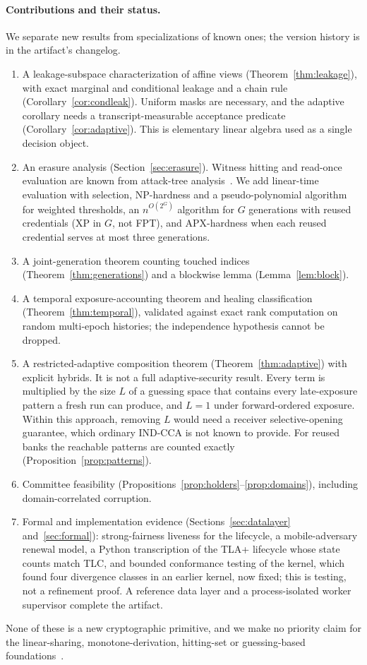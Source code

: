 \documentclass[pdflatex,sn-mathphys-num,twocolumn]{sn-jnl}
\theoremstyle{plain}
\theoremstyle{definition}
\begin{document}
\paragraph{Contributions and their status.}
We separate new results from specializations of known ones; the version history is in the artifact's changelog.
\begin{enumerate}
\item A leakage-subspace characterization of affine views (Theorem~\ref{thm:leakage}), with exact marginal and conditional leakage and a chain rule (Corollary~\ref{cor:condleak}). Uniform masks are necessary, and the adaptive corollary needs a transcript-measurable acceptance predicate (Corollary~\ref{cor:adaptive}). This is elementary linear algebra used as a single decision object.
\item An erasure analysis (Section~\ref{sec:erasure}). Witness hitting and read-once evaluation are known from attack-tree analysis~\cite{mauw2005,lopuhaa2022}. We add linear-time evaluation with selection, NP-hardness and a pseudo-polynomial algorithm for weighted thresholds, an $n^{O(2^G)}$ algorithm for $G$ generations with reused credentials (XP in $G$, not FPT), and APX-hardness when each reused credential serves at most three generations.
\item A joint-generation theorem counting touched indices (Theorem~\ref{thm:generations}) and a blockwise lemma (Lemma~\ref{lem:block}).
\item A temporal exposure-accounting theorem and healing classification (Theorem~\ref{thm:temporal}), validated against exact rank computation on random multi-epoch histories; the independence hypothesis cannot be dropped.
\item A restricted-adaptive composition theorem (Theorem~\ref{thm:adaptive}) with explicit hybrids. It is not a full adaptive-security result. Every term is multiplied by the size $L$ of a guessing space that contains every late-exposure pattern a fresh run can produce, and $L=1$ under forward-ordered exposure. Within this approach, removing $L$ would need a receiver selective-opening guarantee, which ordinary IND-CCA is not known to provide. For reused banks the reachable patterns are counted exactly (Proposition~\ref{prop:patterns}).
\item Committee feasibility (Propositions~\ref{prop:holders}--\ref{prop:domains}), including domain-correlated corruption.
\item Formal and implementation evidence (Sections~\ref{sec:datalayer} and~\ref{sec:formal}): strong-fairness liveness for the lifecycle, a mobile-adversary renewal model, a Python transcription of the TLA+ lifecycle whose state counts match TLC, and bounded conformance testing of the kernel, which found four divergence classes in an earlier kernel, now fixed; this is testing, not a refinement proof. A reference data layer and a process-isolated worker supervisor complete the artifact.
\end{enumerate}
None of these is a new cryptographic primitive, and we make no priority claim for the linear-sharing, monotone-derivation, hitting-set or guessing-based foundations~\cite{karchmer1993,panjwani2007}.
\end{document}
